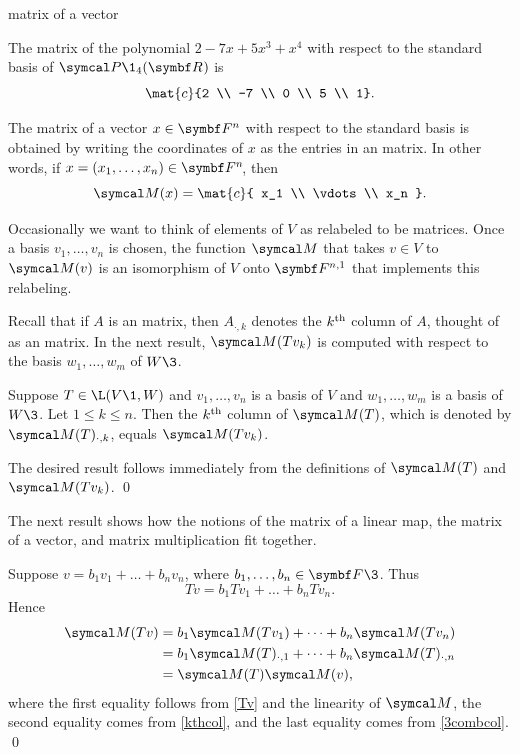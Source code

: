 \begin{example}{matrix of a vector}
\begin{Itemize}
\item
The matrix of the polynomial $2 - 7x + 5x^3 + x^4$ with respect to the standard basis of $\P\1_4(\R{})$ is
\[
\mat{c}{2 \\ -7 \\ 0 \\ 5 \\ 1}.
\]
\item
The matrix of a vector $x \in \F{n}$ with respect to the standard basis
is obtained by writing the coordinates of $x$ as the  entries in an
 matrix.  In other words, if $x = (x_1, \dots, x_n) \in \FF{n}$, then
\[
\M(x) =
\mat{c}{
x_1 \\
\vdots \\
x_n }.
\]
\end{Itemize}
\vspace{-.05in}
\end{example}

Occasionally we want to think of elements of $V$ as relabeled to be  matrices. Once a basis $v_1, \dots, v_n$ is chosen, the function $\M$ that takes $v \in V$ to $\M(v)$ is an isomorphism of $V$ onto $\F{n,1}$ that implements this relabeling.

Recall that if $A$ is an   matrix, then $A_{\cdot, k}$ denotes the $k^{\text{{th}}}$ column of $A$, thought of as an  matrix. In the next result, $\M(Tv_k)$ is computed with respect to the basis $w_1, \dots, w_m$ of $W\3$.

{Suppose $T \in \L(V\1, W)$ and $v_1, \dots, v_n$ is a basis of $V$ and $w_1, \dots, w_m$ is a basis of $W\3$. Let $1 \le k \le n$. Then the $k^{\text{{th}}}$ column of $\M(T)$, which is denoted by $\M(T)_{\cdot, k}$, equals $\M(Tv_k)$.}

\proof
The desired result follows immediately from the definitions of $\M(T)$ and $\M(Tv_k)$. \qed

The next result shows how the notions of the matrix of a linear map, the matrix
of a vector, and matrix multiplication fit together.


\proof
Suppose $v = b_1 v_1 + \dots + b_n v_n$, where $b_1, \dots, b_n \in \F{}\3$. Thus
\begin{equation} \label{Tv}
Tv = b_1 Tv_1 + \dots + b_n Tv_n.
\end{equation}%
Hence
\begin{align*}
\M(Tv) &= b_1 \M(Tv_1) + \dots + b_n \M(Tv_n) \\
&= b_1 \M(T)_{\cdot, 1} + \dots + b_n \M(T)_{\cdot, n} \\
&= \M(T) \M(v),
\end{align*}
where the first equality follows from \ref{Tv} and the linearity of $\M$, the second equality comes from \ref{kthcol},
and the last equality comes from \ref{3combcol}.
\qed

